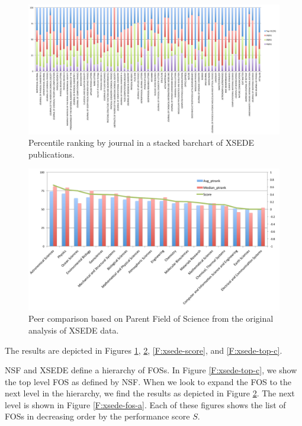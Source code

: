 \documentclass{sig-alternate}
\begin{document}
\begin{figure}[htb!] 
  \centering 
    \includegraphics[width=1.0\textwidth]{images-new/xsede-journal-stacked.pdf} 
  \caption{Percentile ranking by journal in a stacked barchart of XSEDE publications.}\label{F:xsede-stacked} 
\end{figure}

\bigskip

\begin{figure}[htb!] 
  \centering 
    \includegraphics[width=.9\textwidth]{images-new/b.pdf} 
  \caption{Peer comparison based on Parent Field of Science from the original analysis of XSEDE data.}\label{F:xsede-stacked-b} 

\end{figure} 

The results are depicted in Figures \ref{F:xsede-stacked}, \ref{F:xsede-stacked-b}, \ref{F:xsede-score}, and \ref{F:xsede-top-c}. 

NSF and XSEDE define a hierarchy of FOSs. In Figure \ref{F:xsede-top-c}, we show the top level FOS as defined by NSF. When we look to expand the FOS to the next level in the hierarchy, we find the results as depicted in Figure \ref{F:xsede-stacked-b}. The next level is shown in Figure \ref{F:xsede-fos-a}. Each of these figures shows the list of FOSs in decreasing order by the performance score $S$. 
\end{document}
